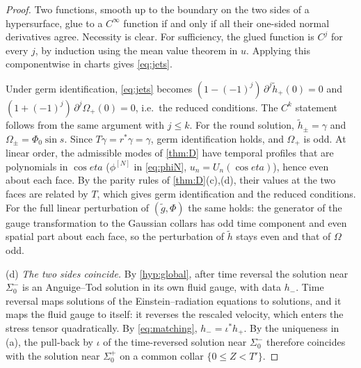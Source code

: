\documentclass[11pt]{article}
\theoremstyle{canonmath}
\theoremstyle{canonpostulate}
\theoremstyle{canonproposition}
\theoremstyle{canonmath}
\theoremstyle{canonproposition}
\def\eta{eta}%
\begin{document}
\begin{proof}
Two functions, smooth up to the boundary on the two sides of a hypersurface, glue to a $C^\infty$ function if and only if all their one-sided normal derivatives agree. Necessity is clear. For sufficiency, the glued function is $C^j$ for every $j$, by induction using the mean value theorem in $u$. Applying this componentwise in charts gives \eqref{eq:jets}.

Under germ identification, \eqref{eq:jets} becomes $(1-(-1)^j)\,\partial^j\tilde h_+(0) = 0$ and $(1+(-1)^j)\,\partial^j\Omega_+(0) = 0$, i.e.\ the reduced conditions. The $C^k$ statement follows from the same argument with $j\le k$. For the round solution, $\tilde h_\pm = \gamma$ and $\Omega_\pm = \Phi_0\sin s$. Since $T\gamma = r^*\gamma = \gamma$, germ identification holds, and $\Omega_+$ is odd. At linear order, the admissible modes of \cref{thm:D} have temporal profiles that are polynomials in $\cos\eta$ ($\phi^{[N]}$ in \eqref{eq:phiN}, $u_n = U_n(\cos\eta)$), hence even about each face. By the parity rules of \cref{thm:D}(c),(d), their values at the two faces are related by $T$, which gives germ identification and the reduced conditions. For the full linear perturbation of $(\tilde g,\Phi)$ the same holds: the generator of the gauge transformation to the Gaussian collars has odd time component and even spatial part about each face, so the perturbation of $\tilde h$ stays even and that of $\Omega$ odd.

(d) \emph{The two sides coincide.} By \ref{hyp:global}, after time reversal the solution near $\Sigma_0^-$ is an Anguige--Tod solution in its own fluid gauge, with data $h_-$. Time reversal maps solutions of the Einstein--radiation equations to solutions, and it maps the fluid gauge to itself: it reverses the rescaled velocity, which enters the stress tensor quadratically. By \eqref{eq:matching}, $h_- = \iota^*h_+$. By the uniqueness in (a), the pull-back by $\iota$ of the time-reversed solution near $\Sigma_0^-$ therefore coincides with the solution near $\Sigma_0^+$ on a common collar $\{0\le Z<T'\}$.


\end{proof}
\end{document}
